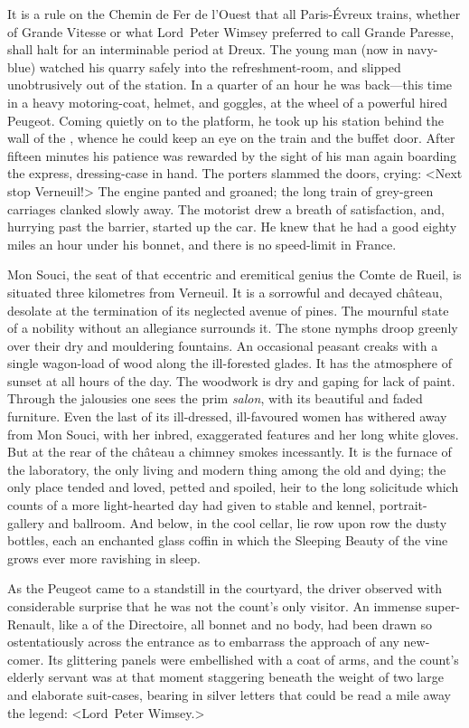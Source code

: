 \divider
It is a rule on the Chemin de Fer de l'Ouest that all Paris-Évreux trains, whether of Grande Vitesse or what Lord~Peter Wimsey preferred to call Grande Paresse, shall halt for an interminable period at Dreux. The young man (now in navy-blue) watched his quarry safely into the refreshment-room, and slipped unobtrusively out of the station. In a quarter of an hour he was back—this time in a heavy motoring-coat, helmet, and goggles, at the wheel of a powerful hired Peugeot. Coming quietly on to the platform, he took up his station behind the wall of the , whence he could keep an eye on the train and the buffet door. After fifteen minutes his patience was rewarded by the sight of his man again boarding the express, dressing-case in hand. The porters slammed the doors, crying: <Next stop Verneuil!> The engine panted and groaned; the long train of grey-green carriages clanked slowly away. The motorist drew a breath of satisfaction, and, hurrying past the barrier, started up the car. He knew that he had a good eighty miles an hour under his bonnet, and there is no speed-limit in France.

\divider
Mon Souci, the seat of that eccentric and eremitical genius the Comte de Rueil, is situated three kilometres from Verneuil. It is a sorrowful and decayed château, desolate at the termination of its neglected avenue of pines. The mournful state of a nobility without an allegiance surrounds it. The stone nymphs droop greenly over their dry and mouldering fountains. An occasional peasant creaks with a single wagon-load of wood along the ill-forested glades. It has the atmosphere of sunset at all hours of the day. The woodwork is dry and gaping for lack of paint. Through the jalousies one sees the prim \textit{salon}, with its beautiful and faded furniture. Even the last of its ill-dressed, ill-favoured women has withered away from Mon Souci, with her inbred, exaggerated features and her long white gloves. But at the rear of the château a chimney smokes incessantly. It is the furnace of the laboratory, the only living and modern thing among the old and dying; the only place tended and loved, petted and spoiled, heir to the long solicitude which counts of a more light-hearted day had given to stable and kennel, portrait-gallery and ballroom. And below, in the cool cellar, lie row upon row the dusty bottles, each an enchanted glass coffin in which the Sleeping Beauty of the vine grows ever more ravishing in sleep.

As the Peugeot came to a standstill in the courtyard, the driver observed with considerable surprise that he was not the count's only visitor. An immense super-Renault, like a  of the Directoire, all bonnet and no body, had been drawn so ostentatiously across the entrance as to embarrass the approach of any new-comer. Its glittering panels were embellished with a coat of arms, and the count's elderly servant was at that moment staggering beneath the weight of two large and elaborate suit-cases, bearing in silver letters that could be read a mile away the legend: <Lord~Peter Wimsey.>

